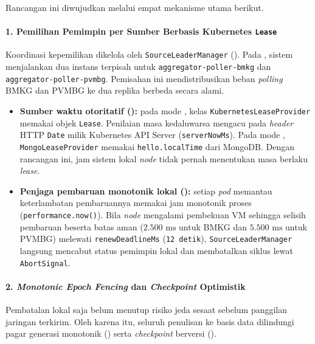 Rancangan ini diwujudkan melalui empat mekanisme utama berikut.

\paragraph*{1. Pemilihan Pemimpin per Sumber Berbasis Kubernetes \texttt{Lease}}
Koordinasi kepemilikan dikelola oleh \texttt{SourceLeaderManager} (). Pada , sistem menjalankan dua instans terpisah untuk \texttt{aggregator-\allowbreak poller-\allowbreak bmkg} dan \texttt{aggregator-\allowbreak poller-\allowbreak pvmbg}. Pemisahan ini mendistribusikan beban \textit{polling} BMKG dan PVMBG ke dua replika berbeda secara alami.

\begin{itemize}
  \item \textbf{Sumber waktu otoritatif ():} pada mode , kelas \texttt{Kubernetes\allowbreak Lease\allowbreak Provider} memakai objek  \texttt{Lease}. Penilaian masa kedaluwarsa mengacu pada \textit{header} HTTP \texttt{Date} milik Kubernetes API Server (\texttt{serverNowMs}). Pada mode , \texttt{MongoLeaseProvider} memakai \texttt{hello.localTime} dari MongoDB. Dengan rancangan ini, jam sistem lokal \textit{node} tidak pernah menentukan masa berlaku \textit{lease}.
  \item \textbf{Penjaga pembaruan monotonik lokal ():} setiap \textit{pod} memantau keterlambatan pembaruannya memakai jam monotonik proses (\texttt{performance.now()}). Bila \textit{node} mengalami pembekuan VM sehingga selisih pembaruan beserta batas aman ($2.500\text{ ms}$ untuk BMKG dan $5.500\text{ ms}$ untuk PVMBG) melewati \texttt{renewDeadlineMs} (\texttt{12 detik}), \texttt{Source\allowbreak Leader\allowbreak Manager} langsung mencabut status pemimpin lokal dan membatalkan siklus lewat \texttt{AbortSignal}.
\end{itemize}

\paragraph*{2. \textit{Monotonic Epoch Fencing} dan \textit{Checkpoint} Optimistik}
Pembatalan lokal saja belum menutup risiko jeda sesaat sebelum panggilan jaringan terkirim. Oleh karena itu, seluruh penulisan ke basis data dilindungi pagar generasi monotonik () serta \textit{checkpoint} berversi ().

